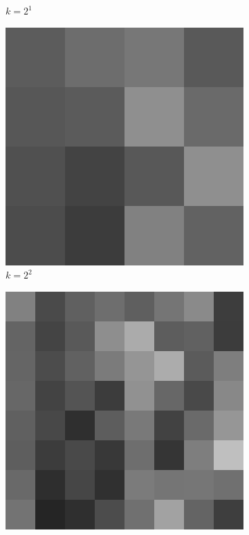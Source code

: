 \begin{figure}[H]
\begin{subfigure}[b]{0.3\textwidth}
        \caption{$k = 2^1$}
    \end{subfigure}
    \hfill
    \begin{subfigure}[b]{0.3\textwidth}
        \centering
        \includegraphics[width=\textwidth]{problem1/image_lena_24bit_4.bmp}
        \caption{$k = 2^2$}
    \end{subfigure}
    \begin{subfigure}[b]{0.3\textwidth}
        \centering
        \includegraphics[width=\textwidth]{problem1/image_lena_24bit_8.bmp}

\end{subfigure}
\end{figure}
